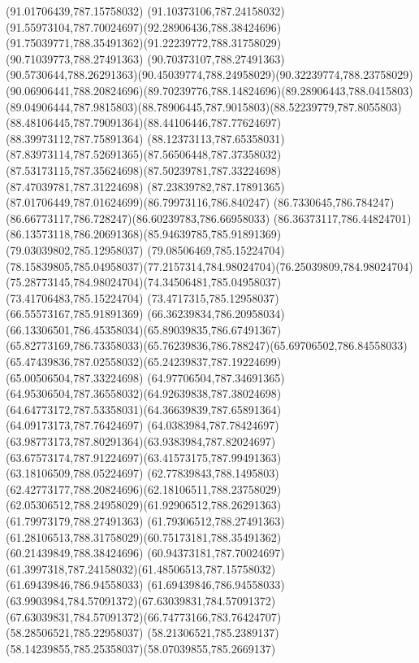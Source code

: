 {{		\lineto(91.01706439,787.15758032)
		\curveto(91.10373106,787.24158032)(91.55973104,787.70024697)(92.28906436,788.38424696)
		\curveto(91.75039771,788.35491362)(91.22239772,788.31758029)(90.71039773,788.27491363)
		\lineto(90.70373107,788.27491363)
		\curveto(90.5730644,788.26291363)(90.45039774,788.24958029)(90.32239774,788.23758029)
		\curveto(90.06906441,788.20824696)(89.70239776,788.14824696)(89.28906443,788.0415803)
		\curveto(89.04906444,787.9815803)(88.78906445,787.9015803)(88.52239779,787.8055803)
		\curveto(88.48106445,787.79091364)(88.44106446,787.77624697)(88.39973112,787.75891364)
		\curveto(88.12373113,787.65358031)(87.83973114,787.52691365)(87.56506448,787.37358032)
		\curveto(87.53173115,787.35624698)(87.50239781,787.33224698)(87.47039781,787.31224698)
		\curveto(87.23839782,787.17891365)(87.01706449,787.01624699)(86.79973116,786.840247)
		\curveto(86.7330645,786.784247)(86.66773117,786.728247)(86.60239783,786.66958033)
		\curveto(86.36373117,786.44824701)(86.13573118,786.20691368)(85.94639785,785.91891369)
		\lineto(79.03039802,785.12958037)
		\lineto(79.08506469,785.15224704)
		\curveto(78.15839805,785.04958037)(77.2157314,784.98024704)(76.25039809,784.98024704)
		\curveto(75.28773145,784.98024704)(74.34506481,785.04958037)(73.41706483,785.15224704)
		\lineto(73.4717315,785.12958037)
		\lineto(66.55573167,785.91891369)
		\curveto(66.36239834,786.20958034)(66.13306501,786.45358034)(65.89039835,786.67491367)
		\curveto(65.82773169,786.73358033)(65.76239836,786.788247)(65.69706502,786.84558033)
		\curveto(65.47439836,787.02558032)(65.24239837,787.19224699)(65.00506504,787.33224698)
		\curveto(64.97706504,787.34691365)(64.95306504,787.36558032)(64.92639838,787.38024698)
		\curveto(64.64773172,787.53358031)(64.36639839,787.65891364)(64.09173173,787.76424697)
		\curveto(64.0383984,787.78424697)(63.98773173,787.80291364)(63.9383984,787.82024697)
		\curveto(63.67573174,787.91224697)(63.41573175,787.99491363)(63.18106509,788.05224697)
		\curveto(62.77839843,788.1495803)(62.42773177,788.20824696)(62.18106511,788.23758029)
		\curveto(62.05306512,788.24958029)(61.92906512,788.26291363)(61.79973179,788.27491363)
		\lineto(61.79306512,788.27491363)
		\curveto(61.28106513,788.31758029)(60.75173181,788.35491362)(60.21439849,788.38424696)
		\curveto(60.94373181,787.70024697)(61.3997318,787.24158032)(61.48506513,787.15758032)
		\lineto(61.69439846,786.94558033)
		\curveto(61.69439846,786.94558033)(63.9903984,784.57091372)(67.63039831,784.57091372)
		\curveto(67.63039831,784.57091372)(66.74773166,783.76424707)(58.28506521,785.22958037)
		\curveto(58.21306521,785.2389137)(58.14239855,785.25358037)(58.07039855,785.2669137)
}}
